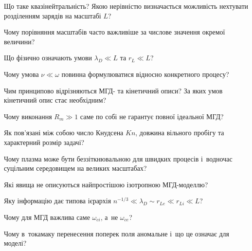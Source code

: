 \begin{Questions}
\begin{quizlist}

\item Що таке квазінейтральність? Якою нерівністю визначається
можливість нехтувати розділенням зарядів на масштабі $L$?

\item Чому порівняння масштабів часто важливіше за числове значення
окремої величини?

\item Що фізично означають умови $\lambda_D\ll L$ та $r_L\ll L$?

\item Чому умова $\nu\ll\omega$ повинна формулюватися відносно
конкретного процесу?

\item Чим принципово відрізняються МГД- та кінетичний описи?
За яких умов кінетичний опис стає необхідним?

\item Чому виконання $R_m\gg1$ саме по собі не гарантує повної
ідеальної МГД?

\item Як пов'язані між собою число Кнудсена $Kn$, довжина вільного
пробігу та характерний розмір задачі?

\item Чому плазма може бути беззіткнювальною для швидких процесів
і~водночас суцільним середовищем на великих масштабах?

\item Які явища не описуються найпростішою ізотропною МГД-моделлю?

\item Яку інформацію дає типова ієрархія
$n^{-1/3}\ll\lambda_D\sim r_{Le}\ll r_{Li}\ll L$?

\item Чому для МГД важлива саме $\omega_{ci}$, а~не $\omega_{ce}$?

\item Чому в~токамаку перенесення поперек поля аномальне і~що це означає для моделі?

\end{quizlist}
\end{Questions}

